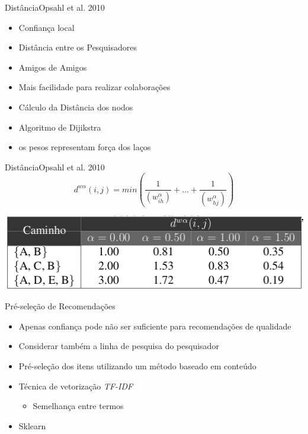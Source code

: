 \documentclass{beamer}
\begin{document}
\begin{frame}{Distância}{Opsahl et al. 2010}
  \begin{itemize}
    \item Confiança local 
    \item Distância entre os Pesquisadores
    \item Amigos de Amigos
    \item Mais facilidade para realizar colaborações
    \item Cálculo da Distância dos nodos
    \item Algoritmo de Dijikstra
    \item os pesos representam força dos laços
  \end{itemize}
\end{frame}

\begin{frame}{Distância}{Opsahl et al. 2010}
  \begin{equation} \label{eqn:distance}
    d^{w\alpha}(i, j) = min \left( \frac{1}{ \left( w_{ih}^{\alpha} \right) } + \dots + \frac{1}{ \left( w_{hj}^{\alpha} \right) }  \right) 
  \end{equation}
  \begin{table}[ht]
    \label{tab:distances}
    \includegraphics[width=.85\textwidth]{distances.png}
  \end{table}
\end{frame}

\begin{frame}{Pré-seleção de Recomendações}{}
  \begin{itemize}
    \item Apenas confiança pode não ser suficiente para recomendações de qualidade
    \item Considerar também a linha de pesquisa do pesquisador
    \item Pré-seleção dos itens utilizando um método baseado em conteúdo
    \item Técnica de vetorização \textit{TF-IDF}
    \begin{itemize}
      \item Semelhança entre termos
    \end{itemize}
    \item Sklearn
  \end{itemize}
\end{frame}
\end{document}
